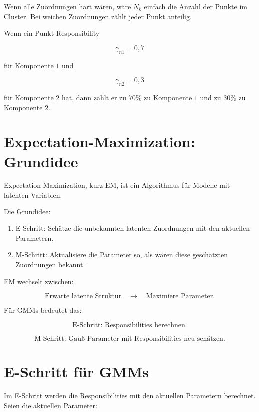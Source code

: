 Wenn alle Zuordnungen hart wären, wäre \(N_k\) einfach die Anzahl der Punkte im Cluster.
Bei weichen Zuordnungen zählt jeder Punkt anteilig.

\begin{examplebox}
Wenn ein Punkt Responsibility

\[
    \gamma_{n1}=0{,}7
\]

für Komponente \(1\) und

\[
    \gamma_{n2}=0{,}3
\]

für Komponente \(2\) hat, dann zählt er zu \(70\%\) zu Komponente \(1\) und zu \(30\%\) zu Komponente \(2\).
\end{examplebox}

\section{Expectation-Maximization: Grundidee}

Expectation-Maximization, kurz EM, ist ein Algorithmus für Modelle mit latenten Variablen.

Die Grundidee:

\begin{enumerate}
    \item E-Schritt:
    Schätze die unbekannten latenten Zuordnungen mit den aktuellen Parametern.

    \item M-Schritt:
    Aktualisiere die Parameter so, als wären diese geschätzten Zuordnungen bekannt.
\end{enumerate}

\begin{conceptbox}
EM wechselt zwischen:

\[
    \text{Erwarte latente Struktur}
    \quad
    \longrightarrow
    \quad
    \text{Maximiere Parameter}.
\]

Für GMMs bedeutet das:

\[
    \text{E-Schritt: Responsibilities berechnen}.
\]

\[
    \text{M-Schritt: Gauß-Parameter mit Responsibilities neu schätzen}.
\]
\end{conceptbox}

\section{E-Schritt für GMMs}

Im E-Schritt werden die Responsibilities mit den aktuellen Parametern berechnet.
Seien die aktuellen Parameter:

